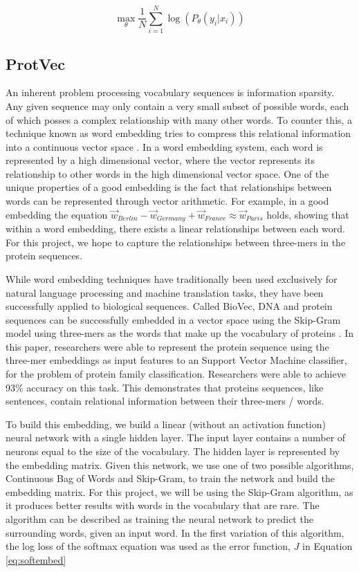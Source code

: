 \documentclass[pageno]{jpaper}
\begin{document}
\begin{equation}
	\underset{\theta}{\max} \frac{1}{N} \sum_{i = 1}^{N} \log(P_{\theta}(y_{i} \vert x_{i}))
\end{equation}

\subsection{ProtVec}
An inherent problem processing vocabulary sequences is information sparsity.  Any given sequence may only contain a very small subset of possible words, each of which posses a complex relationship with many other words.  To counter this, a technique known as word embedding tries to compress this relational information into a continuous vector space \cite{mikolov:2013}.  In a word embedding system, each word is represented by a high dimensional vector, where the vector represents its relationship to other words in the high dimensional vector space.  One of the unique properties of a good embedding is the fact that relationships between words can be represented through vector arithmetic.  For example, in a good embedding the equation $\vec{w}_{Berlin} - \vec{w}_{Germany} + \vec{w}_{France} \approx \vec{w}_{Paris}$ holds, showing that within a word embedding, there exists a linear relationships between each word.  For this project, we hope to capture the relationships between three-mers in the protein sequences.

\par
While word embedding techniques have traditionally been used exclusively for natural language processing and machine translation tasks, they have been successfully applied to biological sequences.  Called BioVec, DNA and protein sequences can be successfully embedded in a vector space using the Skip-Gram model using three-mers as the words that make up the vocabulary of proteins \cite{asgari:2015}.  In this paper, researchers were able to represent the protein sequence using the three-mer embeddings as input features to an Support Vector Machine classifier, for the problem of protein family classification.  Researchers were able to achieve 93\% accuracy on this task.  This demonstrates that proteins sequences, like sentences, contain relational information between their three-mers / words.

\par
To build this embedding, we build a linear (without an activation function) neural network with a single hidden layer.  The input layer contains a number of neurons equal to the size of the vocabulary.  The hidden layer is represented by the embedding matrix.  Given this network, we use one of two possible algorithms, Continuous Bag of Words and Skip-Gram, to train the network and build the embedding matrix.  For this project, we will be using the Skip-Gram algorithm, as it produces better results with words in the vocabulary that are rare.  The algorithm can be described as training the neural network to predict the surrounding words, given an input word.  In the first variation of this algorithm, the log loss of the softmax equation was used as the error function, $J$ in Equation \ref{eq:softembed}
\end{document}
